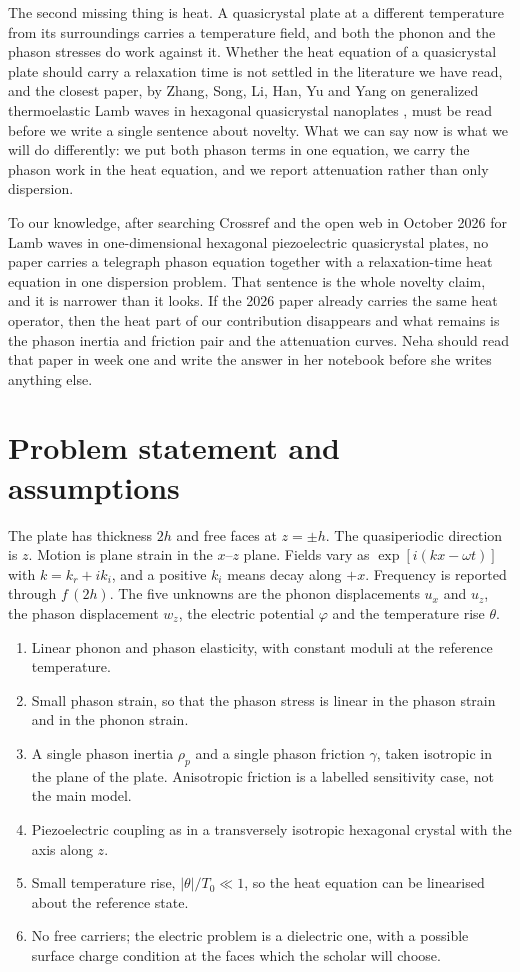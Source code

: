\documentclass[11pt]{article}
\begin{document}
The second missing thing is heat. A quasicrystal plate at a different temperature from its surroundings
carries a temperature field, and both the phonon and the phason stresses do work against it. Whether the
heat equation of a quasicrystal plate should carry a relaxation time is not settled in the literature we
have read, and the closest paper, by Zhang, Song, Li, Han, Yu and Yang on generalized thermoelastic Lamb
waves in hexagonal quasicrystal nanoplates \cite{Zhang2026}, must be read before we write a single sentence
about novelty. What we can say now is what we will do differently: we put both phason terms in one equation,
we carry the phason work in the heat equation, and we report attenuation rather than only dispersion.

To our knowledge, after searching Crossref and the open web in October 2026 for Lamb waves in
one-dimensional hexagonal piezoelectric quasicrystal plates, no paper carries a telegraph phason equation
together with a relaxation-time heat equation in one dispersion problem. That sentence is the whole novelty
claim, and it is narrower than it looks. If the 2026 paper already carries the same heat operator, then the
heat part of our contribution disappears and what remains is the phason inertia and friction pair and the
attenuation curves. Neha should read that paper in week one and write the answer in her notebook before she
writes anything else.

\section{Problem statement and assumptions}

The plate has thickness $2h$ and free faces at $z=\pm h$. The quasiperiodic direction is $z$. Motion is
plane strain in the $x$--$z$ plane. Fields vary as $\exp[i(kx-\omega t)]$ with $k=k_r+ik_i$, and a positive
$k_i$ means decay along $+x$. Frequency is reported through $f\,(2h)$. The five unknowns are the phonon
displacements $u_x$ and $u_z$, the phason displacement $w_z$, the electric potential $\varphi$ and the
temperature rise $\theta$.

\begin{enumerate}
\item Linear phonon and phason elasticity, with constant moduli at the reference temperature.
\item Small phason strain, so that the phason stress is linear in the phason strain and in the phonon
strain.
\item A single phason inertia $\rho_p$ and a single phason friction $\gamma$, taken isotropic in the plane
of the plate. Anisotropic friction is a labelled sensitivity case, not the main model.
\item Piezoelectric coupling as in a transversely isotropic hexagonal crystal with the axis along $z$.
\item Small temperature rise, $|\theta|/T_0\ll1$, so the heat equation can be linearised about the
reference state.
\item No free carriers; the electric problem is a dielectric one, with a possible surface charge condition
at the faces which the scholar will choose.
\end{enumerate}
\end{document}
